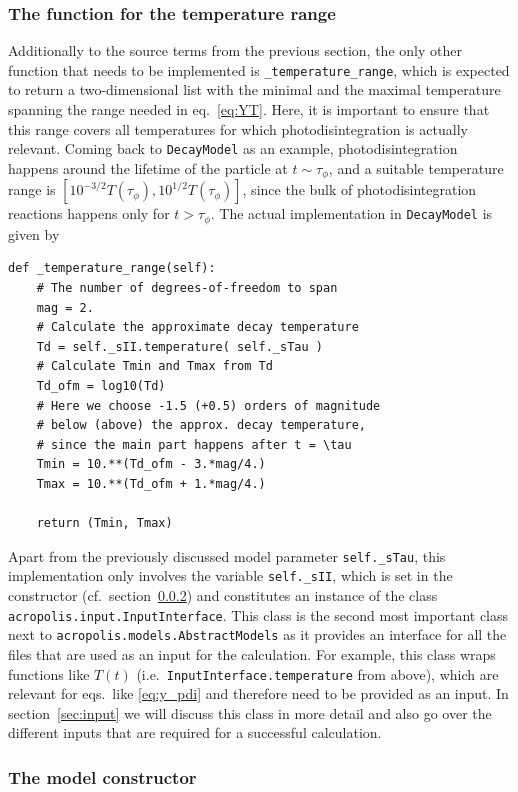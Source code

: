 \documentclass[11pt,a4paper]{article}
\begin{document}
\subsubsection{The function for the temperature range}
Additionally to the source terms from the previous section, the only other function that needs to be implemented is \texttt{\_temperature\_range}, which is expected to return a two-dimensional list with the minimal and the maximal temperature spanning the range needed in eq.~\eqref{eq:YT}. Here, it is important to ensure that this range covers all temperatures for which photodisintegration is actually relevant. Coming back to \texttt{DecayModel} as an example, photodisintegration happens around the lifetime of the particle at $t\sim\tau_\phi$, and a suitable temperature range is $[10^{-3/2}T(\tau_\phi),10^{1/2}T(\tau_\phi)]$, since the bulk of photodisintegration reactions happens only for $t>\tau_\phi$. The actual implementation in \texttt{DecayModel} is given by
\begin{lstlisting}
def _temperature_range(self):
	# The number of degrees-of-freedom to span
	mag = 2.
	# Calculate the approximate decay temperature
	Td = self._sII.temperature( self._sTau )
	# Calculate Tmin and Tmax from Td
	Td_ofm = log10(Td)
	# Here we choose -1.5 (+0.5) orders of magnitude
	# below (above) the approx. decay temperature,
	# since the main part happens after t = \tau
	Tmin = 10.**(Td_ofm - 3.*mag/4.)
	Tmax = 10.**(Td_ofm + 1.*mag/4.)

	return (Tmin, Tmax)
\end{lstlisting}
Apart from the previously discussed model parameter \texttt{self.\_sTau}, this implementation only involves the variable \texttt{self.\_sII}, which is set in the constructor (cf.\ section~\ref{sec:constructor}) and constitutes an instance of the class \texttt{acropolis.input.InputInterface}. This class is the second most important class next to \texttt{acropolis.models.AbstractModels} as it provides an interface for all the files that are used as an input for the calculation. For example, this class wraps functions like $T(t)$ (i.e.\ \texttt{InputInterface.temperature} from above), which are relevant for eqs.\ like \eqref{eq:y_pdi} and therefore need to be provided as an input. In section~\ref{sec:input} we will discuss this class in more detail and also go over the different inputs that are required for a successful calculation.

\subsubsection{The model constructor}
\label{sec:constructor}
\end{document}
